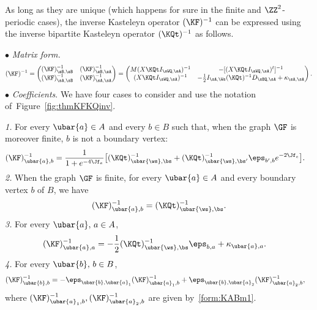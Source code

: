 \documentclass[a4paper,twoside,11pt]{article}
\begin{document}
\begin{thm}\label{thm:KFKQinv}
As long as they are unique (which happens for sure in the finite and $\ZZ^2$-periodic cases), 
the inverse Kasteleyn operator $(\KF)^{-1}$ can be expressed using the inverse bipartite Kasteleyn operator $(\KQt)^{-1}$ as follows.

$\bullet$ \emph{Matrix form.}
\begin{equation}
\label{equ:thmKFKQinv}
(\KF)^{-1}=
\begin{pmatrix}
(\KF)^{-1}_{\sB,\sB}&(\KF)^{-1}_{\sB,\sA}\\ 
(\KF)^{-1}_{\sA,\sB}&(\KF)^{-1}_{\sA,\sA}
\end{pmatrix}=
\begin{pmatrix}
M(X\KQt I_{\sWQ,\sA})^{-1}&-[(X\KQt I_{\sWQ,\sA})^t]^{-1}\\
(X\KQt I_{\sWQ,\sA})^{-1}&-\frac{1}{2}I_{\sA,\Ws}(\KQt)^{-1}D_{\sBQ,\sA}+\kappa_{\sA,\sA}
\end{pmatrix}.
\end{equation}
$\bullet$ \emph{Coefficients}. We have four cases to consider and use the notation of~Figure~\ref{fig:thmKFKQinv}.

\emph{1.} For every $\ubar{a}\in A$ and every $b\in B$ such that, when the graph $\GF$ is moreover finite, $b$ is not a boundary vertex:
\begin{align}\label{form:KABm1}
(\KF)^{-1}_{\ubar{a},b}&=\frac{1}{1+e^{-4\Jf_e}}
\bigl[(\KQt)^{-1}_{\ubar{\ws},\bs} + (\KQt)^{-1}_{\ubar{\ws},\bs'}\eps_{b',b}e^{-2\Jf_e}\bigr].
\end{align}
\emph{2.} When the graph $\GF$ is finite, for every $\ubar{a}\in A$ and every boundary vertex $b$ of $B$, we have
\begin{equation}\label{form:KABm1_finite}
(\KF)^{-1}_{\ubar{a},b}=(\KQt)^{-1}_{\ubar{\ws},\bs}.
\end{equation}
\emph{3.} For every $\ubar{a},\,a\in A$,
\begin{align}\label{form:KAAm1}
(\KF)^{-1}_{\ubar{a},a}&=-\frac{1}{2}(\KQt)^{-1}_{\ubar{\ws},\bs}\eps_{b,a}+\kappa_{\ubar{a},a}.
\end{align}
\emph{4.} For every $\ubar{b},\,b\in B$,
\begin{align}\label{form:KBBm1}
(\KF)^{-1}_{\ubar{b},b}&=-\eps_{\ubar{b},\ubar{a}_1}(\KF)^{-1}_{\ubar{a}_1,b}+\eps_{\ubar{b},\ubar{a}_2}(\KF)^{-1}_{\ubar{a}_2,b},
\end{align}
where $(\KF)^{-1}_{\ubar{a}_1,b},(\KF)^{-1}_{\ubar{a}_2,b}$ are given by~\eqref{form:KABm1}.
\end{thm}
\end{document}
